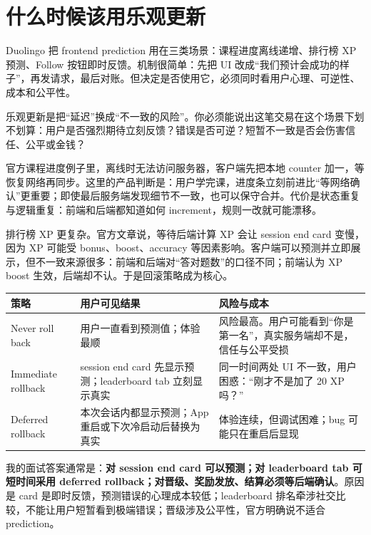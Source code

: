 \section{什么时候该用乐观更新}

\srcofficial Duolingo 把 frontend prediction 用在三类场景：课程进度离线递增、排行榜 XP 预测、Follow 按钮即时反馈。机制很简单：先把 UI 改成“我们预计会成功的样子”，再发请求，最后对账。但决定是否使用它，必须同时看用户心理、可逆性、成本和公平性。

\begin{idea}[乐观更新的本质]
乐观更新是把“延迟”换成“不一致的风险”。你必须能说出这笔交易在这个场景下划不划算：用户是否强烈期待立刻反馈？错误是否可逆？短暂不一致是否会伤害信任、公平或金钱？
\end{idea}

官方课程进度例子里，离线时无法访问服务器，客户端先把本地 counter 加一，等恢复网络再同步。这里的产品判断是：用户学完课，进度条立刻前进比“等网络确认”更重要；即使最后服务端发现细节不一致，也可以保守合并。代价是状态重复与逻辑重复：前端和后端都知道如何 increment，规则一改就可能漂移。

排行榜 XP 更复杂。\srcofficial 官方文章说，等待后端计算 XP 会让 session end card 变慢，因为 XP 可能受 bonus、boost、accuracy 等因素影响。客户端可以预测并立即展示，但不一致来源很多：前端和后端对“答对题数”的口径不同；前端认为 XP boost 生效，后端却不认。于是回滚策略成为核心。

\begin{center}
\begin{tabularx}{\textwidth}{p{} X X}
\toprule
策略 & 用户可见结果 & 风险与成本 \\
\midrule
Never roll back & 用户一直看到预测值；体验最顺 & 风险最高。用户可能看到“你是第一名”，真实服务端却不是，信任与公平受损 \\
Immediate rollback & session end card 先显示预测；leaderboard tab 立刻显示真实 & 同一时间两处 UI 不一致，用户困惑：“刚才不是加了 20 XP 吗？” \\
Deferred rollback & 本次会话内都显示预测；App 重启或下次冷启动后替换为真实 & 体验连续，但调试困难；bug 可能只在重启后显现 \\
\bottomrule
\end{tabularx}
\end{center}

我的面试答案通常是：\textbf{对 session end card 可以预测；对 leaderboard tab 可短时间采用 deferred rollback；对晋级、奖励发放、结算必须等后端确认}。原因是 card 是即时反馈，预测错误的心理成本较低；leaderboard 排名牵涉社交比较，不能让用户短暂看到极端错误；晋级涉及公平性，官方明确说不适合 prediction。

